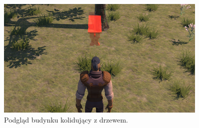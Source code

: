 \begin{figure}[h!]
    \centering
    \includegraphics[width=0.9\textwidth]{images/implementacja/mechanizm_budowania/kolizja_drzewo.png}
    \caption{Podgląd budynku kolidujący z drzewem.}
\end{figure}
